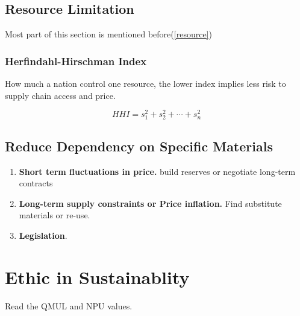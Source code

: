 \documentclass{NoteThesis/note-thesis}
\begin{document}
\subsection{Resource Limitation}

Most part of this section is mentioned before(\ref{resource})

\subsubsection*{Herfindahl-Hirschman Index}

How much a nation control one resource, the lower index implies less risk to supply chain access and price.

\[
HHI=s_1^2+s_2^2+\cdots + s_n^2
\]

\subsection{Reduce Dependency on Specific Materials}

\begin{enumerate}
    \item \textbf{Short term fluctuations in price.} build reserves or negotiate long-term contracts
    \item \textbf{Long-term supply constraints or Price inflation.} Find substitute materials or re-use.
    \item \textbf{Legislation}.
\end{enumerate}

\section{Ethic in Sustainablity}

Read the QMUL and NPU values.
\end{document}
